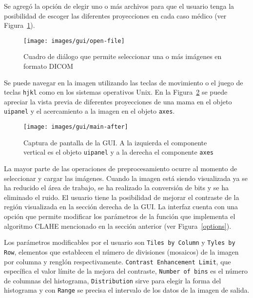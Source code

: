 Se agregó la opción de elegir uno o más archivos para que el usuario tenga la
posibilidad de escoger las diferentes proyecciones en cada caso médico (ver
Figura~\ref{fig:openfile}).

\begin{figure}[h]
  \begin{center}
    {\texttt{[image: images/gui/open-file]}}
  \end{center}
  \caption[GUI: Selección de archivos]
  {Cuadro de diálogo que permite seleccionar una o más imágenes en formato DICOM}
  \label{fig:openfile}
\end{figure}

Se puede navegar en la imagen utilizando las teclas de movimiento o el juego de
teclas \texttt{hjkl} como en los sistemas operativos Unix. En la
Figura~\ref{main:after} se puede apreciar la vista previa de diferentes
proyecciones de una mama en el objeto \texttt{uipanel} y el acercamiento a la
imagen en el objeto \texttt{axes}.

\begin{figure}[h]
  \begin{center}
    {\texttt{[image: images/gui/main-after]}}
  \end{center}

  \caption[GUI: Ventana principal 2]{Captura de pantalla de la GUI. A la
  izquierda el componente vertical es el objeto \texttt{uipanel} y a la derecha
  el componente \texttt{axes}}

  \label{main:after}
\end{figure}

La mayor parte de las operaciones de preprocesamiento ocurre al momento de
seleccionar y cargar las imágenes. Cuando la imagen está siendo visualizada ya
se ha reducido el área de trabajo, se ha realizado la conversión de bits y se
ha eliminado el ruido. El usuario tiene la posibilidad de mejorar el contraste
de la región visualizada en la sección derecha de la GUI. La interfaz cuenta
con una opción que permite modificar los parámetros de la función que
implementa el algoritmo CLAHE mencionado en la sección anterior (ver
Figura~\ref{options}).

Los parámetros modificables por el usuario son \texttt{Tiles by Column} y
\texttt{Tyles by Row}, elementos que establecen el número de divisiones
(mosaicos) de la imagen por columna y renglón respectivamente. \texttt{Contrast
Enhancement Limit}, que específica el valor límite de la mejora del contraste,
\texttt{Number of bins} es el número de columnas del histograma,
\texttt{Distribution} sirve para elegir la forma del histograma y con
\texttt{Range} se precisa el intervalo de los datos de la imagen de salida.

